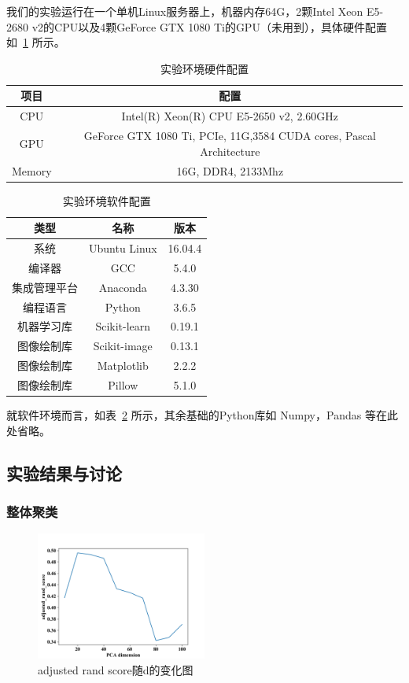 \documentclass[UTF8]{ctexart}
\begin{document}
我们的实验运行在一个单机Linux服务器上，机器内存64G，2颗Intel Xeon E5-2680 v2的CPU以及4颗GeForce GTX 1080 Ti的GPU（未用到），具体硬件配置如~\ref{tab:hard} 所示。

\begin{table}[!h]
  \centering
  \caption{实验环境硬件配置}\label{tab:hard}
  \begin{tabular}{cc}
    \toprule
    项目 & 配置 \\
    \midrule
    CPU & Intel(R) Xeon(R) CPU E5-2650 v2, 2.60GHz\\
    GPU & GeForce GTX 1080 Ti, PCIe, 11G,3584 CUDA cores, Pascal Architecture\\
    Memory & 16G, DDR4, 2133Mhz\\
    \bottomrule
  \end{tabular}
\end{table}
\begin{table}[!h]
  \centering
  \caption{实验环境软件配置}\label{tab:soft}
  \begin{tabular}{ccc}
    \toprule
    类型 & 名称 & 版本 \\
    \midrule
    系统 & Ubuntu Linux & 16.04.4\\
    编译器 & GCC & 5.4.0\\
    集成管理平台 & Anaconda & 4.3.30\\
    编程语言 & Python & 3.6.5\\
    机器学习库 & Scikit-learn & 0.19.1\\
    图像绘制库 & Scikit-image & 0.13.1\\
    图像绘制库 & Matplotlib & 2.2.2\\
    图像绘制库 & Pillow & 5.1.0\\
    \bottomrule
  \end{tabular}
\end{table}

就软件环境而言，如表~\ref{tab:soft} 所示，其余基础的Python库如 Numpy，Pandas 等在此处省略。

\subsection{实验结果与讨论}

\subsubsection{整体聚类}

\begin{figure}[!h]
  \includegraphics[width=0.5\textwidth]{./figures/cluster_adjusted_rand_score.png}
  \centering
  \caption{adjusted rand score随d的变化图}
  \label{cluster_adjusted_rand_score}
\end{figure}
\end{document}
